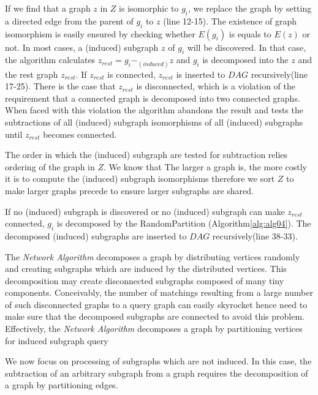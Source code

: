 If we find that a graph $z$ in $Z$ is isomorphic to $g_i$, we replace the graph by setting a directed edge from the parent of $g_i$ to $z$ (line 12-15).
The existence of graph isomorphism is easily ensured by checking whether $E(g_i)$ is equals to $E(z)$ or not. 
In most cases, a (induced) subgraph $z$ of $g_i$ will be discovered. 
In that case, the algorithm calculates $z_{rest} = g_i -_{(induced)} z$ and $g_i$ is decomposed into the $z$ and the rest graph $z_{rest}$.
If $z_{rest}$ is connected, $z_{rest}$ is inserted to $DAG$ recursively(line 17-25).
There is the case that $z_{rest}$ is disconnected, which is a violation of the requirement that a connected graph is decomposed into two connected graphs. 
When faced with this violation the algorithm abandons the result and tests the subtractions of all (induced) subgraph isomorphisms of all (induced) subgraphs until $z_{rest}$ becomes connected.

The order in which the  (induced) subgraph are tested for subtraction relies ordering of the graph in $Z$.
We know that The larger a graph is, the more costly it is to compute the (induced) subgraph isomorphisms therefore we sort $Z$ to make larger graphs precede to ensure larger subgraphs are shared.

If no (induced) subgraph is discovered or no (induced) subgraph can make $z_{rest}$ connected, $g_i$ is decomposed by the RandomPartition (Algorithm\ref{alg:alg04}).
The decomposed (induced) subgraphs are inserted to $DAG$ recursively(line 38-33).

The \textit{Network Algorithm} decomposes a graph by distributing vertices randomly and creating subgraphs which are induced by the distributed vertices.
This decomposition may create disconnected subgraphs composed of many tiny components.
Conceivably, the number of matchings resulting from a large number of such disconnected graphs to a query graph can easily skyrocket hence need to make sure that the decomposed subgraphs are connected to avoid this problem. Effectively, the \textit{Network Algorithm} decomposes a graph by partitioning vertices for induced subgraph query

We now focus on processing of subgraphs which are not induced. In this case, the subtraction of an arbitrary subgraph from a graph requires the decomposition of a graph by partitioning edges.

